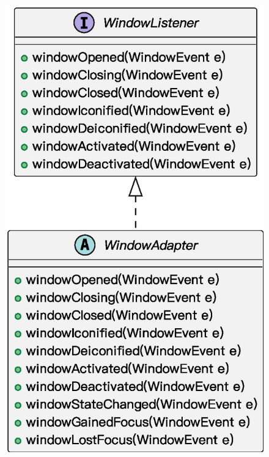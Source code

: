 \begin{figure}[H]
{\begin{minipage}[c]{0.4\linewidth}
        \centering
        \includegraphics[width=0.97\linewidth]{images/适配器模式拓展2.eps}
    \end{minipage}
    }
	\centering
    \vspace{-1em}
\end{figure}

